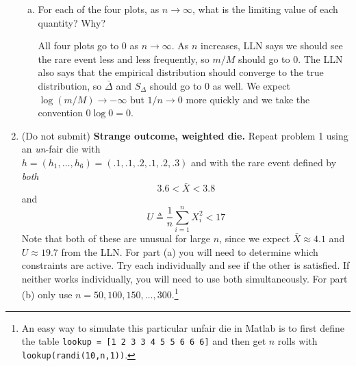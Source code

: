 \documentclass[11pt]{report}
\begin{document}
\begin{enumerate}[1.]
\begin{enumerate}[(a)]
              \item For each of the four plots, as $n\to\infty$, what is the limiting value of each quantity?  Why?

                    \color{blue}
                    All four plots go to $0$ as $n\to \infty$. As $n$ increases, LLN says we should see the rare event less and less frequently, so $m/M$ should go to $0$. The LLN also says that the empirical distribution should converge to the true distribution, so $\bar \Delta$ and $S_{\Delta}$ should go to $0$ as well. We expect $\log(m/M) \to -\infty$ but $1/n \to 0$ more quickly and we take the convention $0\log 0 = 0$.
                    \color{black}

          \end{enumerate}

          \pagebreak

    \item  {\color{blue} (Do not submit)} {\bf Strange outcome, weighted die.} Repeat problem 1 using an {\em un}-fair die with \\ $h=(h_1,\dotsc,h_6)=(.1,.1,.2,.1,.2,.3)$ and with the rare event defined by {\em both}
          \begin{equation*}
              3.6 < \bar X < 3.8  %
          \end{equation*}
          and
          \begin{equation*}
              U \triangleq \frac{1}{n}\sum_{i=1}^n X_i^2 < 17 %
          \end{equation*}
          Note that both of these are unusual for large $n$, since we expect $\bar X \approx 4.1$ and $U\approx 19.7$ from the LLN.  For part (a) you will need to determine which constraints are active.  Try each individually and see if the other is satisfied.  If neither works individually, you will need to use both simultaneously.  For part (b) only use $n=50,100,150,\dotsc,300$.\footnote{An easy way to simulate this particular unfair die in Matlab is to first define the table {\tt lookup = [1 2 3 3 4 5 5 6 6 6]} and then get $n$ rolls with {\tt lookup(randi(10,n,1))}.}

          \pagebreak


\end{enumerate}
\end{document}
